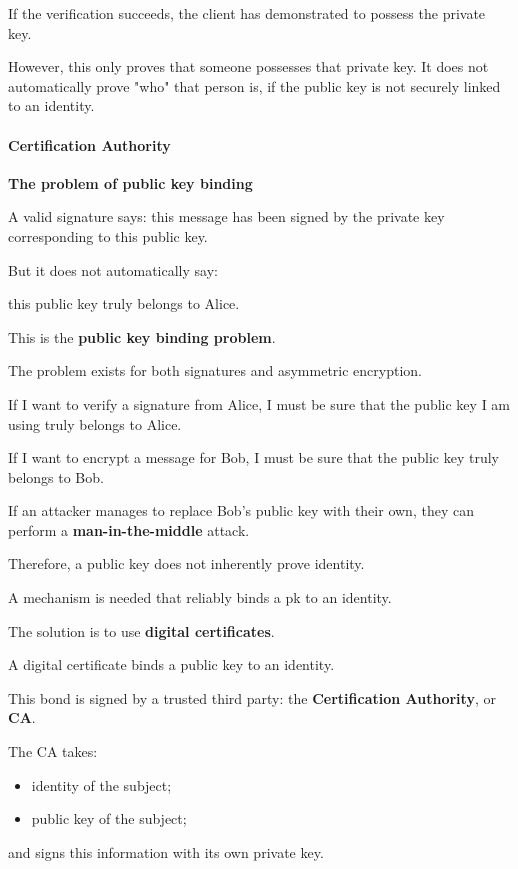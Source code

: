 \documentclass{article}
\begin{document}
If the verification succeeds, the client has demonstrated to possess the private key.

However, this only proves that someone possesses that private key. It does not automatically prove "who" that person is, if the public key is not securely linked to an identity.

\paragraph*{Certification Authority}

\textbf{The problem of public key binding}

A valid signature says:
this message has been signed by the private key corresponding to this public key.

But it does not automatically say:

this public key truly belongs to Alice.

This is the \textbf{public key binding problem}.

The problem exists for both signatures and asymmetric encryption.

If I want to verify a signature from Alice, I must be sure that the public key I am using truly belongs to Alice.

If I want to encrypt a message for Bob, I must be sure that the public key truly belongs to Bob.

If an attacker manages to replace Bob's public key with their own, they can perform a \textbf{man-in-the-middle} attack.

Therefore, a public key does not inherently prove identity.

A mechanism is needed that reliably binds a pk to an identity.

The solution is to use \textbf{digital certificates}.

A digital certificate binds a public key to an identity.

This bond is signed by a trusted third party: the \textbf{Certification Authority}, or \textbf{CA}.

The CA takes:

\begin{itemize}
\item identity of the subject;
\item public key of the subject;
\end{itemize}

and signs this information with its own private key.
\end{document}

